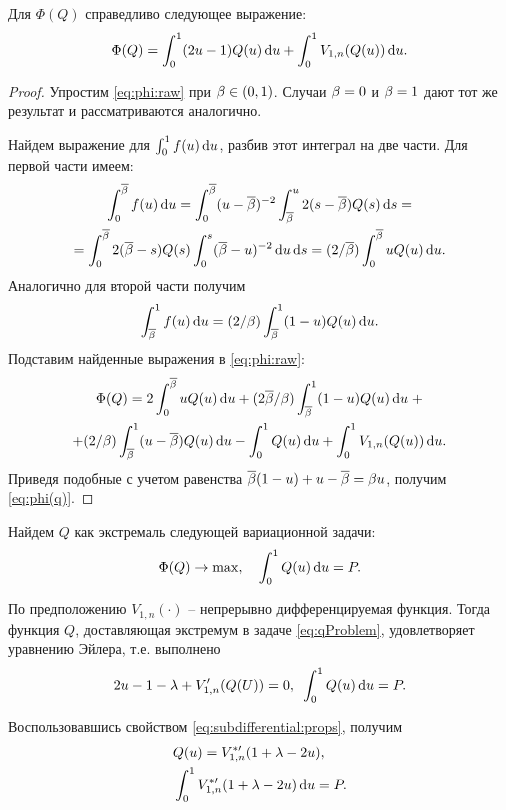 \begin{lemma}\label{lemma:phi:formula}
  Для $\Phi(Q)$ справедливо следующее выражение:
  \begin{equation}\label{eq:phi(q)}
    \Phi(Q) = \int_0^1 (2u - 1) Q(u) \mathop{}\!\mathrm{d} u + \int_0^1 V_{1,n}(Q(u)) \mathop{}\!\mathrm{d} u.
  \end{equation}
\end{lemma}
\begin{proof}
  Упростим \eqref{eq:phi:raw} при $\beta \in (0, 1)$. Случаи $\beta = 0$ и $\beta = 1$
  дают тот же результат и рассматриваются аналогично.

  Найдем выражение для $\int_0^1 f(u) \mathop{}\!\mathrm{d} u$, разбив этот интеграл на две части.
  Для первой части имеем:
  \begin{multline*}
    \int_0^{{\overline{\beta}}} f(u) \mathop{}\!\mathrm{d} u = \int_0^{{\overline{\beta}}} (u - {\overline{\beta}})^{-2} \int_{{\overline{\beta}}}^u 2(s - {\overline{\beta}}) Q(s) \mathop{}\!\mathrm{d} s = \\
    = \int_0^{{\overline{\beta}}} 2 ({\overline{\beta}} - s) Q(s) \int_0^s ({\overline{\beta}} - u)^{-2} \mathop{}\!\mathrm{d} u \mathop{}\!\mathrm{d} s =
    (2/{\overline{\beta}}) \int_0^{{\overline{\beta}}} u Q(u) \mathop{}\!\mathrm{d} u.
  \end{multline*}
  Аналогично для второй части получим
  \begin{gather*}
    \int_{{\overline{\beta}}}^1 f(u) \mathop{}\!\mathrm{d} u = (2/\beta) \int_{{\overline{\beta}}}^1 (1-u) Q(u) \mathop{}\!\mathrm{d} u.
  \end{gather*}
  Подставим найденные выражения в \eqref{eq:phi:raw}:
  \begin{multline*}
    \Phi(Q) = 2 \int_0^{{\overline{\beta}}} u Q(u) \mathop{}\!\mathrm{d} u + (2{\overline{\beta}}/\beta) \int_{{\overline{\beta}}}^1 (1-u) Q(u) \mathop{}\!\mathrm{d} u \; + \\
    + (2/\beta) \int_{{\overline{\beta}}}^1 (u - {\overline{\beta}}) Q(u) \mathop{}\!\mathrm{d} u - \int_0^1 Q(u) \mathop{}\!\mathrm{d} u + \int_0^1
    V_{1,n}(Q(u)) \mathop{}\!\mathrm{d} u.
  \end{multline*}
  Приведя подобные с учетом равенства ${\overline{\beta}} (1-u) + u - {\overline{\beta}} = \beta u$, получим
  \eqref{eq:phi(q)}.
\end{proof}

Найдем $Q$ как экстремаль следующей вариационной задачи:
\begin{align}
  \label{eq:qProblem}
  \Phi(Q) \rightarrow \max, \quad
  \int_0^1 Q(u) \mathop{}\!\mathrm{d} u = P.
\end{align}

По предположению $V_{1,n}(\cdot)$ -- непрерывно дифференцируемая функция. Тогда
функция $Q$, доставляющая экстремум в задаче \eqref{eq:qProblem}, удовлетворяет
уравнению Эйлера, т.е. выполнено
\[
  2u - 1 - \lambda + V_{1,n}'(Q(U)) = 0, \enskip \int_0^1 Q(u) \mathop{}\!\mathrm{d} u = P.
\]

Воспользовавшись свойством \eqref{eq:subdifferential:props}, получим
\begin{align}
  \label{eq:qFormula}
  &Q(u) = V^{*\prime}_{1,n}(1+\lambda-2u),\\
  \label{eq:lambdaCond}
  &\int_0^1 V^{*\prime}_{1,n}(1+\lambda-2u) \mathop{}\!\mathrm{d} u = P.
\end{align}

